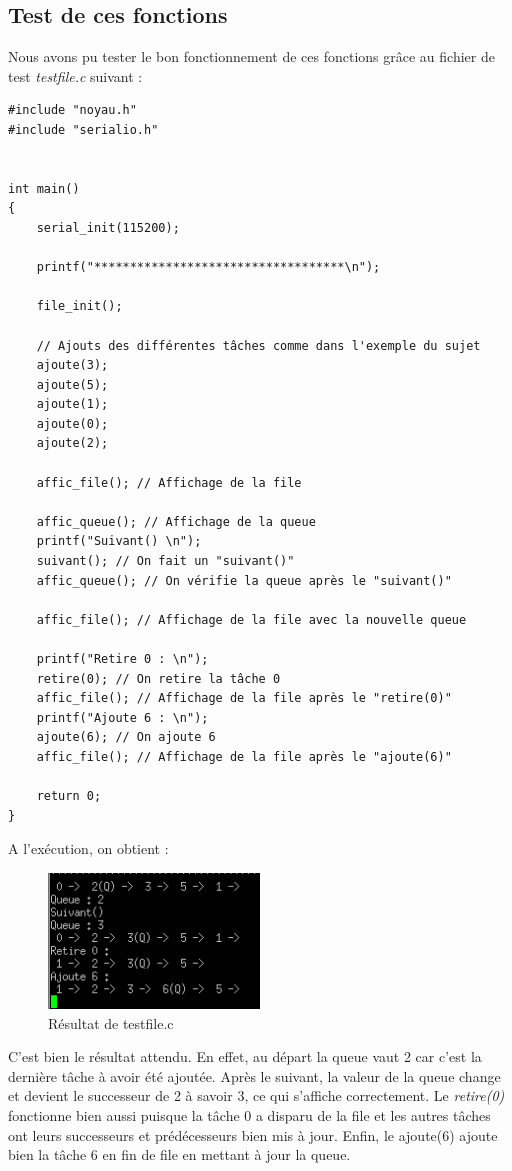 \documentclass[a4paper,12pt]{report}
\begin{document}
\subsection{Test de ces fonctions}
Nous avons pu tester le bon fonctionnement de ces fonctions grâce au fichier de test \textit{testfile.c} suivant :
\begin{lstlisting}
#include "noyau.h"
#include "serialio.h"


int main()
{
	serial_init(115200);
	
	printf("***********************************\n");

	file_init();

	// Ajouts des différentes tâches comme dans l'exemple du sujet
	ajoute(3);
	ajoute(5);
	ajoute(1);
	ajoute(0);
	ajoute(2);

	affic_file(); // Affichage de la file

	affic_queue(); // Affichage de la queue
	printf("Suivant() \n");
	suivant(); // On fait un "suivant()"
	affic_queue(); // On vérifie la queue après le "suivant()"

	affic_file(); // Affichage de la file avec la nouvelle queue

	printf("Retire 0 : \n");
	retire(0); // On retire la tâche 0
	affic_file(); // Affichage de la file après le "retire(0)"
	printf("Ajoute 6 : \n");
	ajoute(6); // On ajoute 6
	affic_file(); // Affichage de la file après le "ajoute(6)"

	return 0;
}
\end{lstlisting}
\newpage
A l'exécution, on obtient :
\begin{figure}[h]
	\centering
		\includegraphics[width=0.5\textwidth]{screens/tp1/Exo1_NEW.PNG}
		\caption{Résultat de testfile.c}
		\label{testfile}
\end{figure}

C'est bien le résultat attendu. En effet, au départ la queue vaut 2 car c'est la dernière tâche à avoir été ajoutée. Après le suivant, la valeur de la queue change et devient le successeur de 2 à savoir 3, ce qui s'affiche correctement. Le \textit{retire(0)} fonctionne bien aussi puisque la tâche 0 a disparu de la file et les autres tâches ont leurs successeurs et prédécesseurs bien mis à jour. Enfin, le ajoute(6) ajoute bien la tâche 6 en fin de file en mettant à jour la queue.
\end{document}

